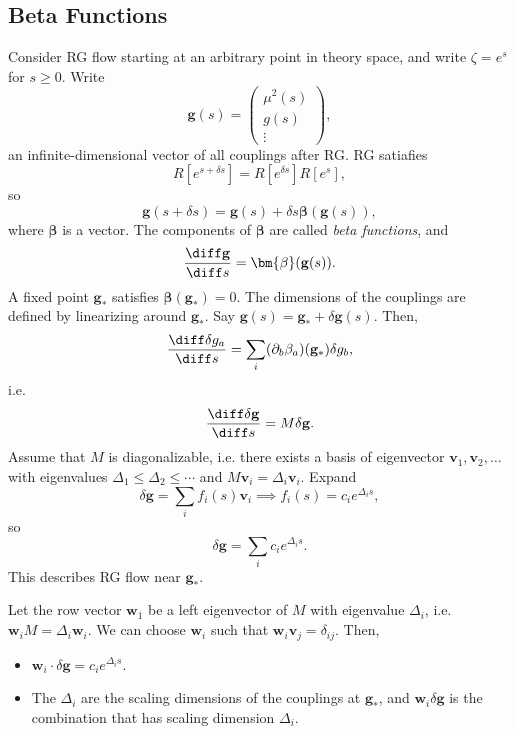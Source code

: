 \documentclass[12pt]{article}
\begin{document}
\subsection{Beta Functions}%
\label{sub:bfs}

Consider RG flow starting at an arbitrary point in theory space, and write $\zeta = e^{s}$ for $s \geq 0$. Write
\[
\mathbf{g}(s) =
\begin{pmatrix}
	\mu^2(s) \\ g(s) \\ \vdots
\end{pmatrix},
\]
an infinite-dimensional vector of all couplings after RG. RG satiafies
\[
	R[e^{s + \delta s}] = R[e^{\delta s}] R[e^{s}],
\]
so
\[
\mathbf{g}(s + \delta s) = \mathbf{g}(s) + \delta s \bm{\beta} (\mathbf{g}(s)),
\]
where $\bm{\beta}$ is a vector. The components of $\bm{\beta}$ are called \emph{beta functions}, and
\[
\frac{\diff \mathbf{g}}{\diff s} = \bm{\beta} (\mathbf{g}(s)).
\]
A fixed point $\mathbf{g}_\ast$ satisfies $\bm{\beta}(\mathbf{g}_\ast) = 0$. The dimensions of the couplings are defined by linearizing around $\mathbf{g}_\ast$. Say $\mathbf{g}(s) = \mathbf{g}_\ast + \delta \mathbf{g}(s)$. Then,
\[
\frac{\diff \delta g_a}{\diff s} = \sum_i (\partial_b\beta_a)(\mathbf{g}_\ast) \delta g_{b},
\]
i.e.
\[
\frac{\diff \delta \mathbf{g}}{\diff s} = M \delta \mathbf{g}.
\]
Assume that $M$ is diagonalizable, i.e. there exists a basis of eigenvector $\mathbf{v}_1, \mathbf{v}_2, \ldots$ with eigenvalues $\Delta_1 \leq \Delta_2 \leq \cdots$ and $M \mathbf{v}_i = \Delta_i \mathbf{v}_i$. Expand
\[
\delta \mathbf{g} = \sum_i f_i(s) \mathbf{v}_i \implies f_i(s) = c_i e^{\Delta_i s},
\]
so
\[
\delta \mathbf{g} = \sum_i c_i e^{\Delta_i s}.
\]
This describes RG flow near $\mathbf{g}_\ast$.


Let the row vector $\mathbf{w}_1$ be a left eigenvector of $M$ with eigenvalue $\Delta_i$, i.e. $\mathbf{w}_i M = \Delta_i \mathbf{w}_i$. We can choose $\mathbf{w}_i$ such that $\mathbf{w}_i \mathbf{v}_j = \delta_{ij}$. Then,
\begin{itemize}
	\item $\mathbf{w}_i \cdot \delta \mathbf{g} = c_i e^{\Delta_i s}$.
	\item The $\Delta_i$ are the scaling dimensions of the couplings at $\mathbf{g}_\ast$, and $\mathbf{w}_i \delta \mathbf{g}$ is the combination that has scaling dimension $\Delta_i$.
\end{itemize}
\end{document}
